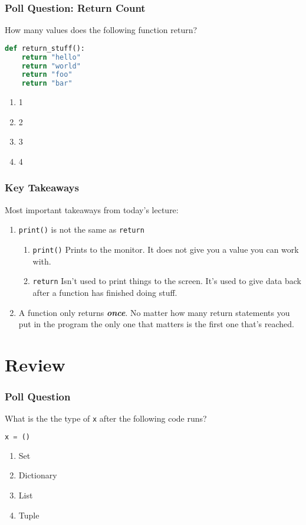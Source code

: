 \documentclass{beamer}
\begin{document}
%
%
\begin{frame}[fragile]
  \frametitle{Poll Question: Return Count} 
  How many values does the following function return?
  \begin{lstlisting}[language=Python, autogobble]
  def return_stuff():
    return "hello"
    return "world"
    return "foo"
    return "bar"
  \end{lstlisting}
  \vfill
  \begin{enumerate}[A]
    \item 1
    \item 2
    \item 3
    \item 4
  \end{enumerate}
\end{frame}

%
%
\begin{frame}
  \frametitle{Key Takeaways}
  Most important takeaways from today's lecture:
  \begin{enumerate}[A]
    \item \lstinline|print()| is not the same as \lstinline|return|
      \begin{enumerate}[A]
        \item  \lstinline|print()| \textrightarrow Prints to the monitor. It does not give you a value you can work with.
        \item  \lstinline|return| \textrightarrow Isn't used to print things to the screen. It's used to give data back after a function has finished doing stuff.
      \end{enumerate}
    \item A function only returns \textit{\textbf{once}}. No matter how many return statements you put in the program the only one that matters is the first one that's reached.
  \end{enumerate}
\end{frame}

\section{Review}

%
%
\begin{frame}[fragile]
  \frametitle{Poll Question}
  What is the the type of \lstinline|x| after the following code runs?
  \begin{lstlisting}[language=Python, autogobble]
  x = ()
  \end{lstlisting}
  \vfill
  \begin{enumerate}[A] 
    \item Set
    \item Dictionary
    \item List
    \item Tuple
  \end{enumerate}
\end{frame}
\end{document}
